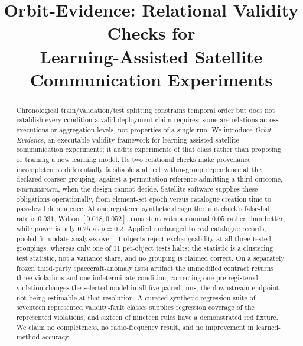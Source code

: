 \documentclass[conference]{IEEEtran}
\newcommand{\artv}[2]{#2}
\begin{document}
\title{Orbit-Evidence: Relational Validity Checks for\\
Learning-Assisted Satellite Communication Experiments}

\author{}

\maketitle

\begin{abstract}
Chronological train/validation/test splitting constrains temporal order but does not establish every
condition a valid deployment claim requires: some are relations across executions or aggregation
levels, not properties of a single run. We introduce
\emph{Orbit-Evidence}, an executable validity framework for learning-assisted satellite
communication experiments; it audits experiments of that class rather than proposing or training a
new learning model. Its two relational checks make provenance incompleteness
differentially falsifiable and test within-group dependence at the declared coarser grouping,
against a permutation reference admitting a third outcome, \textsc{indeterminate}, when the design
cannot decide. Satellite software supplies these obligations operationally, from
element-set epoch versus catalogue creation time to pass-level dependence. At one registered synthetic design the unit check's
false-halt rate is $\artv{l47_rate}{0.031}$, Wilson
$\artv{l47_wilson}{[0.018,0.052]}$, consistent with a nominal $\artv{l47_alpha}{0.05}$ rather than
better, while power is only $\artv{l47_power_02}{0.25}$ at $\rho=0.2$. Applied unchanged to real
catalogue records, pooled fit-update analyses over \artv{real_objects}{\num{11}} objects reject
exchangeability at all three tested groupings, whereas only \artv{real_halt}{one} of
\artv{real_objects}{\num{11}} per-object tests halts; the statistic is a clustering test statistic,
not a variance share, and no grouping is claimed correct. On a separately frozen
third-party spacecraft-anomaly \textsc{lstm} artifact the unmodified contract returns
\artv{ext_halt}{three} violations and \artv{ext_indet}{one} indeterminate condition; correcting one
pre-registered violation changes the selected model in all \artv{cons_seeds}{five} paired runs, the
downstream endpoint not being estimable at that resolution. A curated synthetic regression suite of
\artv{fault_class_count}{seventeen} represented validity-fault classes supplies regression coverage
of the represented violations, and \artv{red_fixture}{sixteen} of \artv{rule_count}{nineteen} rules have a
demonstrated red fixture. We claim no completeness, no radio-frequency result, and no
improvement in learned-method accuracy.
\end{abstract}
\end{document}
